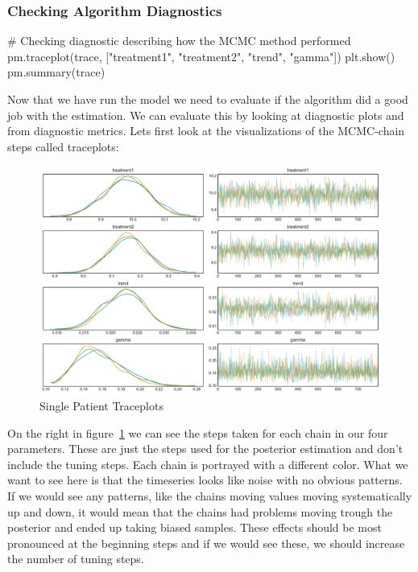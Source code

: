 \documentclass[12pt,a4paper,leqno]{report}
\theoremstyle{plain}
\theoremstyle{definition}
\theoremstyle{remark}
\begin{document}
\subsubsection{Checking Algorithm Diagnostics}

\bigskip
\begin{pyverbatim}
# Checking diagnostic describing how the MCMC method performed
pm.traceplot(trace, ["treatment1", "treatment2", "trend", "gamma"])
plt.show()
pm.summary(trace)
\end{pyverbatim}
\bigskip

Now that we have run the model we need to evaluate if the algorithm did a good job with
the estimation. We can evaluate this by looking at diagnostic plots and from diagnostic
metrics. Lets first look at the visualizations of the MCMC-chain steps called traceplots:

\begin{figure}[H]
    \caption{Single Patient Traceplots}
    \label{traceplots}
    \includegraphics[width=\textwidth,height=\textheight,keepaspectratio]{single_patient_traceplot.pdf}
\end{figure}

On the right in figure\ \ref{traceplots} we can see the steps taken for each
chain in our four parameters. These are
just the steps used for the posterior estimation and don't include the tuning steps. Each
chain is portrayed with a different color. What we want to see here is that the timeseries
looks like noise with no obvious patterns. If we would see any patterns, like the chains
moving values moving systematically up and down, it would mean that the
chains had problems moving trough the posterior and ended up taking biased samples.
These effects should be most pronounced at the beginning steps and if we would see
these, we should increase the number of tuning steps.
\end{document}
